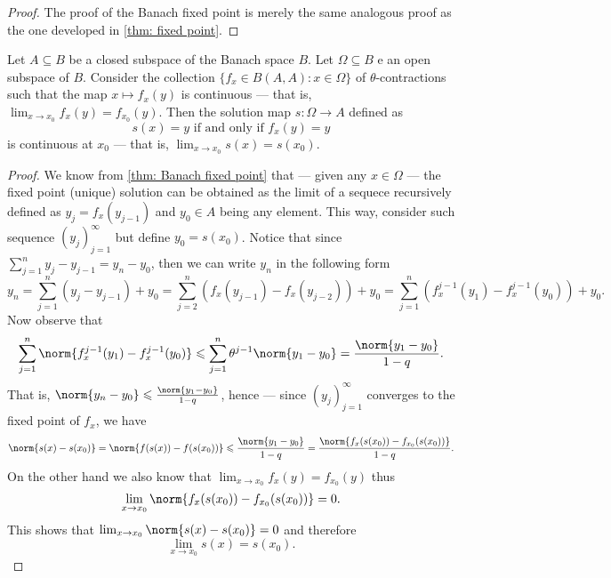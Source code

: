 \begin{proof}
  The proof of the Banach fixed point is merely the same analogous proof as the
  one developed in \cref{thm: fixed point}.
\end{proof}

\begin{proposition}
\label{prop:fixed-point-stability}
Let \(A \subseteq B\) be a closed subspace of the Banach space \(B\). Let \(\Omega \subseteq B\) e
an open subspace of \(B\). Consider the collection \(\{f_{x} \in B(A, A) : x \in
\Omega\}\)   of \(\theta\)-contractions such that the map \(x \mapsto f_x(y)\) is continuous ---
that is, \(\lim_{x\to x_0} f_x(y) = f_{x_0}(y)\).
Then the solution map \(s: \Omega \to A\) defined as
\[
s(x) = y \text{ if and only if } f_x(y) = y
\]
is continuous at \(x_0\) --- that is, \(\lim_{x \to x_0} s(x) = s(x_0)\).
\end{proposition}

\begin{proof}
  We know from \cref{thm: Banach fixed point} that --- given any \(x \in \Omega\) ---
  the fixed point (unique) solution can be obtained as the limit of
  a sequece recursively defined as \(y_j = f_x(y_{j-1})\) and \(y_0 \in A\) being
  any element. This way, consider such sequence \((y_j)_{j=1}^{\infty}\) but define
  \(y_0 = s(x_0)\). Notice that since \(\sum_{j=1}^n y_j - y_{j-1} = y_n - y_0\),
  then we can write \(y_n\) in the following form
  \[
    y_n = \sum_{j=1}^n (y_j - y_{j-1}) + y_0
    = \sum_{j=2}^n (f_x(y_{j-1}) - f_x(y_{j-2}))
    + y_0 = \sum_{j=1}^n \left(f_x^{j-1}(y_1) - f_x^{j-1}(y_0)\right) + y_{0}.
  \]
  Now observe that
  \[
    \sum_{j=1}^n \norm{f_x^{j-1}(y_1) - f_x^{j-1}(y_0)}
    \leq \sum_{j=1}^n \theta^{j-1} \norm{y_1 -
    y_0} = \frac{\norm{y_1 - y_0}}{1 - q}.
  \]
  That is, \(\norm{y_n - y_0} \leq \frac{\norm{y_1 - y_0}}{1 - q}\), hence --- since
  \((y_j)_{j=1}^{\infty}\) converges to the fixed point of \(f_x\), we have
  \begin{align*}
    \norm{s(x) - s(x_0)} = \norm{f(s(x)) - f(s(x_0))}
    \leq \frac{\norm{y_1 - y_0}}{1-q}
    = \frac{\norm{f_x(s(x_0)) - f_{x_0}(s(x_0))}}{1 - q}.
  \end{align*}
  On the other hand we also know that \(\lim_{x \to x_0}f_x(y) = f_{x_0}(y)\) thus
  \[
    \lim_{x \to x_0} \norm{f_x(s(x_0)) - f_{x_0}(s(x_0))} = 0.
  \]
  This shows that \(\lim_{x \to x_0} \norm{s(x) - s(x_0)} = 0\) and therefore
  \[
    \lim_{x \to x_0} s(x) = s(x_0).
  \]
\end{proof}

